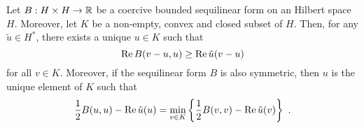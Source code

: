 \begin{theorem}[Stampacchia] \label{fu_an_stamp}
Let $B:H\times H\rightarrow \mathbb{R}$ be a coercive bounded sequilinear form
on an Hilbert space $H$.  
Moreover, let $K$ be a non-empty, convex and
closed subset of $H$.  Then, for any $\displaystyle \tilde{u} \in H^\ast$, there
exists a unique $u\in K$ such that
\begin{equation} \label{fu_an_lax1}
\operatorname{Re} B(v-u,u) \geq \operatorname{Re} \tilde{u}(v-u)
\end{equation}
for all $v \in K$.  Moreover, if the sequilinear form $B$ is also
symmetric, then $u$ is the unique element of $K$ such that
\begin{equation} \label{fu_an_lax8}
\frac{1}{2}B(u,u) - \operatorname{Re}\tilde{u}(u) = \min_{v\in K} \left\{
\frac{1}{2}B(v,v) - \operatorname{Re}\tilde{u}(v) \right\} \ .
\end{equation}
\end{theorem}

